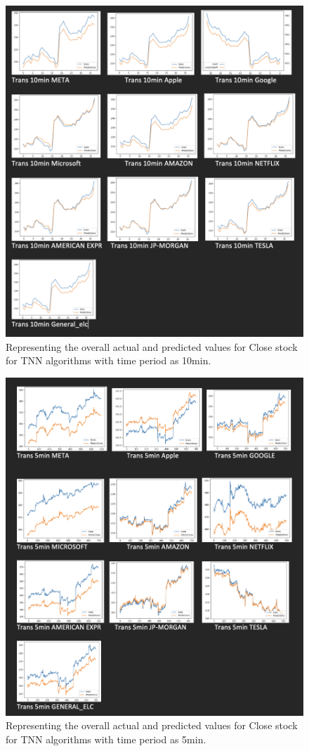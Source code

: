 \begin{figure}[ht]
    \centering
    \includegraphics[scale=0.4]{figures/Trans 10min.png}
    \caption{Representing the overall actual and predicted values for Close stock for TNN algorithms with time period as 10min.}
    \label{fig:chart_a}
\end{figure}

\begin{figure}[ht]
    \centering
    \includegraphics[scale=0.4]{figures/Trans 5min.png}
    \caption{Representing the overall actual and predicted values for Close stock for TNN algorithms with time period as 5min.}
    \label{fig:chart_a}
\end{figure}



